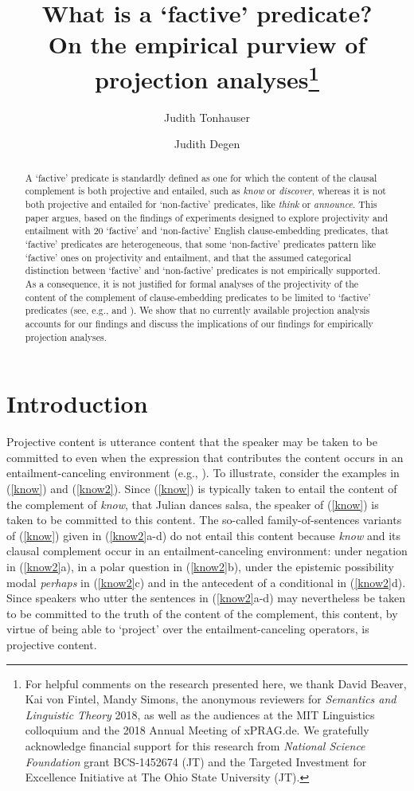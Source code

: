\documentclass[11pt,fleqn]{article}
\title{What is a `factive' predicate? \\ On the empirical purview of projection analyses\thanks{For helpful comments on the research presented here, we thank David Beaver, Kai von Fintel, Mandy Simons, the anonymous reviewers for {\em Semantics and Linguistic Theory} 2018, as well as the audiences at the MIT Linguistics colloquium and the 2018 Annual Meeting of xPRAG.de. We gratefully acknowledge financial support for this research from {\em National Science Foundation} grant BCS-1452674 (JT) and the Targeted Investment for Excellence Initiative at The Ohio State University (JT).}}
\author[$\circ$]{Judith Tonhauser}
\author[$\bullet$]{Judith Degen}
\affil[$\circ$]{The Ohio State University / University of Stuttgart}
\affil[$\bullet$]{Stanford University}
\newcommand{\6}{\mbox{$[\hspace*{-.6mm}[$}}
\newcommand{\9}{\mbox{$]\hspace*{-.6mm}]$}}
\begin{document}

\maketitle


\begin{abstract}

A `factive' predicate is standardly defined as one for which the content of the clausal complement is both projective and entailed, such as {\em know} or {\em discover}, whereas it is not both projective and entailed for `non-factive' predicates, like {\em think} or {\em announce}. This paper argues, based on the findings of experiments designed to explore projectivity and entailment with 20 `factive' and `non-factive' English clause-embedding predicates, that `factive' predicates are heterogeneous, that some `non-factive' predicates pattern like `factive' ones on projectivity and entailment, and that the assumed categorical distinction between `factive' and `non-factive' predicates is not empirically supported. As a consequence, it is not justified for formal analyses of the projectivity of the content of the complement of clause-embedding predicates to be limited to `factive' predicates (see, e.g., \citealt{heim83,vds92,abrusan2011,abrusan2016,romoli2015} and \citealt{best-question}). We show that no currently available projection analysis accounts for our findings and discuss the implications of our findings for empirically projection analyses.

\end{abstract}
			
\section{Introduction}\label{s1}

Projective content is utterance content that the speaker may be taken to be committed to even when the expression that contributes the content occurs in an entailment-canceling environment (e.g., \citealt{brst-salt10,brst-lang11,tbd-variability}). To illustrate, consider the examples in (\ref{know}) and (\ref{know2}). Since (\ref{know}) is typically taken to entail the content of the complement of {\em know}, that Julian dances salsa, the speaker of (\ref{know}) is taken to be committed to this content. The so-called family-of-sentences variants of (\ref{know}) given in (\ref{know2}a-d) do not entail this content because {\em know} and its clausal complement occur in an entailment-canceling environment: under negation in (\ref{know2}a), in a polar question in (\ref{know2}b), under the epistemic possibility modal {\em perhaps} in (\ref{know2}c) and in the antecedent of a conditional in (\ref{know2}d). Since speakers who utter the sentences in (\ref{know2}a-d) may nevertheless be taken to be committed to the truth of the content of the complement, this content, by virtue of being able to `project' over the entailment-canceling operators, is projective content. 
\end{document}
